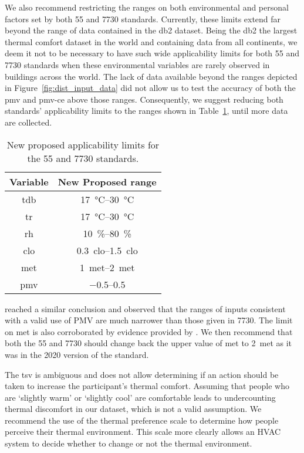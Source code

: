 We also recommend restricting the ranges on both environmental and personal factors set by both \gls{55} and \gls{7730} standards.
Currently, these limits extend far beyond the range of data contained in the \ac{db2} dataset.
Being the \ac{db2} the largest thermal comfort dataset in the world and containing data from all continents, we deem it not to be necessary to have such wide applicability limits for both \gls{55} and \gls{7730} standards when these environmental variables are rarely observed in buildings across the world.
The lack of data available beyond the ranges depicted in Figure~\ref{fig:dist_input_data} did not allow us to test the accuracy of both the \ac{pmv} and \ac{pmv-ce} above those ranges.
Consequently, we suggest reducing both standards' applicability limits to the ranges shown in Table~\ref{tab:ranges}, until more data are collected.
\begin{table}[htb!]
    \centering
    \begin{tabular}{cc}
        \toprule
        Variable & New Proposed range \\
        \midrule
        \ac{tdb} & \qtyrange{17}{30}{\celsius} \\
        \ac{tr} & \qtyrange{17}{30}{\celsius} \\
        \ac{rh} & \qtyrange{10}{80}{\percent} \\
        \ac{clo} & \qtyrange{0.3}{1.5}{clo} \\
        \ac{met} & \qtyrange{1}{2}{met} \\
        \ac{pmv} & \numrange{-.5}{.5} \\
        \bottomrule
    \end{tabular}
    \caption{New proposed applicability limits for the \gls{55} and \gls{7730} standards.}
    \label{tab:ranges}
\end{table}
 reached a similar conclusion and observed that the ranges of inputs consistent with a valid use of PMV are much narrower than those given in \gls{7730}.
The limit on \ac{met} is also corroborated by evidence provided by .
We then recommend that both the \gls{55} and \gls{7730} should change back the upper value of \ac{met} to \qty{2}{met} as it was in the 2020 version of the standard.

The \ac{tsv} is ambiguous and does not allow determining if an action should be taken to increase the participant's thermal comfort.
Assuming that people who are `slightly warm' or `slightly cool' are comfortable leads to undercounting thermal discomfort in our dataset, which is not a valid assumption.
We recommend the use of the thermal preference scale to determine how people perceive their thermal environment. 
This scale more clearly allows an HVAC system to decide whether to change or not the thermal environment.

